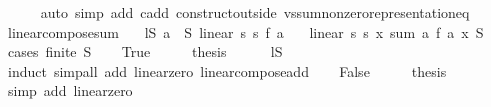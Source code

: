 \begin{isabellebody}
\ \ \ \ \isamarkupfalse%
\ {\isacharparenleft}{\kern0pt}auto\ simp\ add{\isacharcolon}{\kern0pt}\ c{\isachardot}{\kern0pt}add\ construct{\isacharunderscore}{\kern0pt}outside\ vs{}{\isachardot}{\kern0pt}sum{\isacharunderscore}{\kern0pt}nonzero{\isacharunderscore}{\kern0pt}representation{\isacharunderscore}{\kern0pt}eq{\isacharparenright}{\kern0pt}\isanewline
{}\isamarkupfalse%
%
\endisatagproof
{\isafoldproof}%
%
\isadelimproof
\isanewline
%
\endisadelimproof
\isanewline
{}\isamarkupfalse%
\ linear{\isacharunderscore}{\kern0pt}compose{\isacharunderscore}{\kern0pt}sum{\isacharcolon}{\kern0pt}\isanewline
\ \ \ lS{\isacharcolon}{\kern0pt}\ {\isachardoublequoteopen}{\isasymforall}a\ {\isasymin}\ S{\isachardot}{\kern0pt}\ linear\ s{}\ s{}\ {\isacharparenleft}{\kern0pt}f\ a{\isacharparenright}{\kern0pt}{\isachardoublequoteclose}\isanewline
\ \ \ {\isachardoublequoteopen}linear\ s{}\ s{}\ {\isacharparenleft}{\kern0pt}{\isasymlambda}x{\isachardot}{\kern0pt}\ sum\ {\isacharparenleft}{\kern0pt}{\isasymlambda}a{\isachardot}{\kern0pt}\ f\ a\ x{\isacharparenright}{\kern0pt}\ S{\isacharparenright}{\kern0pt}{\isachardoublequoteclose}\isanewline
%
\isadelimproof
%
\endisadelimproof
%
\isatagproof
{}\isamarkupfalse%
\ {\isacharparenleft}{\kern0pt}cases\ {\isachardoublequoteopen}finite\ S{\isachardoublequoteclose}{\isacharparenright}{\kern0pt}\isanewline
\ \ \isamarkupfalse%
\ True\isanewline
\ \ \isamarkupfalse%
\ \isamarkupfalse%
\ {\isacharquery}{\kern0pt}thesis\isanewline
\ \ \ \ \isamarkupfalse%
\ lS\ \isamarkupfalse%
\ induct\ {\isacharparenleft}{\kern0pt}simp{\isacharunderscore}{\kern0pt}all\ add{\isacharcolon}{\kern0pt}\ linear{\isacharunderscore}{\kern0pt}zero\ linear{\isacharunderscore}{\kern0pt}compose{\isacharunderscore}{\kern0pt}add{\isacharparenright}{\kern0pt}\isanewline
{}\isamarkupfalse%
\isanewline
\ \ \isamarkupfalse%
\ False\isanewline
\ \ \isamarkupfalse%
\ \isamarkupfalse%
\ {\isacharquery}{\kern0pt}thesis\isanewline
\ \ \ \ \isamarkupfalse%
\ {\isacharparenleft}{\kern0pt}simp\ add{\isacharcolon}{\kern0pt}\ linear{\isacharunderscore}{\kern0pt}zero{\isacharparenright}{\kern0pt}\isanewline
{}\isamarkupfalse%
%
\endisatagproof
{\isafoldproof}%
%
\isadelimproof
\isanewline
%
\endisadelimproof
\isanewline
{}\isamarkupfalse%

\end{isabellebody}
